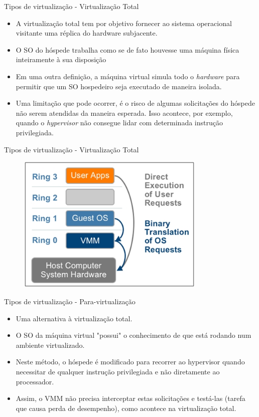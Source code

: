 \documentclass{beamer}
\begin{document}
\begin{frame}{Tipos de virtualização - Virtualização Total}

\begin{itemize}
 \item A virtualização total tem por objetivo fornecer ao sistema operacional visitante uma réplica do hardware subjacente.
 \item O SO do hóspede trabalha como se de fato houvesse uma máquina física inteiramente à sua disposição
 \item Em uma outra definição, a máquina virtual simula todo o {\it hardware} para permitir que um SO hospedeiro seja executado de maneira isolada. 
 \item Uma limitação que pode ocorrer, é o risco de algumas solicitações do hóspede não serem atendidas da maneira esperada. 
 Isso acontece, por exemplo, quando o {\it hypervisor} não consegue lidar com determinada instrução privilegiada.

\end{itemize}
\end{frame}

\begin{frame}{Tipos de virtualização - Virtualização Total}
\begin{figure}[hbtp]
\centering
\includegraphics[width=9cm]{Images/TotalVirt.jpg}
\label{figRotulo}
\end{figure}
\end{frame}

\begin{frame}{Tipos de virtualização - Para-virtualização}

\begin{itemize}
 \item Uma alternativa à virtualização total.
 \item O SO da máquina virtual "possui" o conhecimento de que está rodando num ambiente virtualizado. 
 \item Neste método, o hóspede é modificado para recorrer ao hypervisor quando necessitar de qualquer instrução 
 privilegiada e não diretamente ao processador.
 \item Assim, o VMM não precisa interceptar estas solicitações e testá-las (tarefa que causa perda de desempenho), como acontece na virtualização total.
\end{itemize}
\end{frame}
\end{document}
